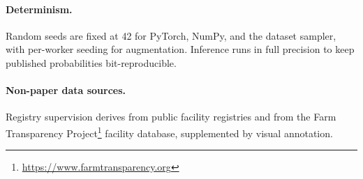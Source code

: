 \documentclass[11pt,a4paper]{article}
\begin{document}
\paragraph{Determinism.} Random seeds are fixed at 42 for PyTorch, NumPy, and the
dataset sampler, with per-worker seeding for augmentation. Inference runs in
full precision to keep published probabilities bit-reproducible.

\paragraph{Non-paper data sources.} Registry supervision derives from public
facility registries and from the Farm Transparency
Project\footnote{\url{https://www.farmtransparency.org}} facility database,
supplemented by visual annotation.



\end{document}
